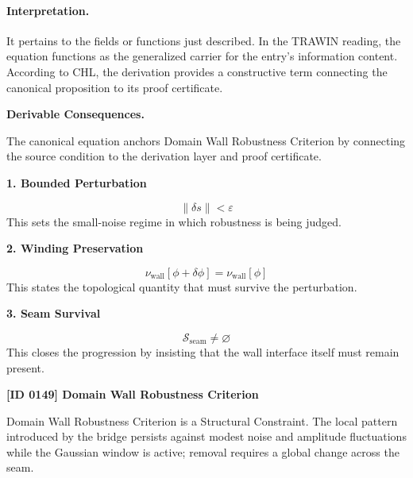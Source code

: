 \paragraph{Interpretation.}
It pertains to the fields or functions just described. In the TRAWIN reading, the equation functions as the generalized carrier for the entry’s information content. According to CHL, the derivation provides a constructive term connecting the canonical proposition to its proof certificate.

\par\vspace{0.35em}
\noindent\textbf{Derivable Consequences.}\quad
\begingroup
\footnotesize
\raggedright
The canonical equation anchors Domain Wall Robustness Criterion by connecting the source condition to the derivation layer and proof certificate.
\par\endgroup

\noindent\textbf{1. Bounded Perturbation}\par
\[
\|\delta s\|<\varepsilon
\]
\noindent This sets the small-noise regime in which robustness is being judged.\par
\noindent\textbf{2. Winding Preservation}\par
\[
\nu_{\mathrm{wall}}[\phi+\delta\phi]=\nu_{\mathrm{wall}}[\phi]
\]
\noindent This states the topological quantity that must survive the perturbation.\par
\noindent\textbf{3. Seam Survival}\par
\[
\mathcal{S}_{\mathrm{seam}}\neq \varnothing
\]
\noindent This closes the progression by insisting that the wall interface itself must remain present.\par

\clearpage
\noindent\textbf{[ID 0149] Domain Wall Robustness Criterion}\par
\vspace{0.35em}
\begingroup\small
{}
Domain Wall Robustness Criterion is a Structural Constraint. The local pattern introduced by the bridge persists against modest noise and amplitude fluctuations while the Gaussian window is active; removal requires a global change across the seam.

